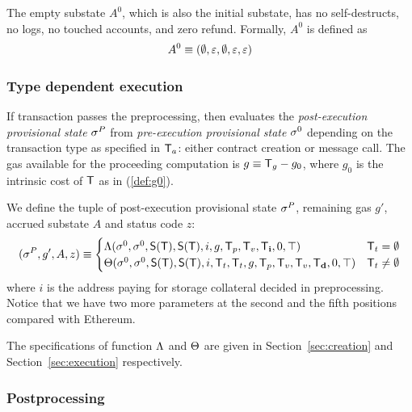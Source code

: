 The empty substate $A^0$, which is also the initial substate, has no self-destructs, no logs, no touched accounts, and zero refund. Formally, $A^0$ is defined as
\begin{align}
	A^0\equiv \left( \emptyset, \mathbb{\varepsilon}, \emptyset, \mathbb{\varepsilon},\mathbb{\varepsilon}\right)
\end{align}


\subsubsection{Type dependent execution}

If transaction passes the preprocessing, 
then {\name} evaluates the \emph{post-execution provisional state} $\mathbf{\sigma}^P$ from \emph{pre-execution provisional state} $\mathbf{\sigma}^0$ depending on the transaction type as specified in $\textsf{T}_a$: either contract creation or message call. 
%
The gas available for the proceeding computation is $g\equiv \textsf{T}_g-g_0$, where $g_0$ is the intrinsic cost of $\textsf{T}$ as in (\ref{def:g0}). 

We define the tuple of post-execution provisional state $\mathbf{\sigma}^{P}$, remaining gas $g'$, accrued substate $A$ and status code $z$:
\begin{align}\label{def:transform}
	(\mathbf{\sigma}^{P},g',A,z)\equiv
	\begin{cases}
		\mathrm{\Lambda}(\mathbf{\sigma}^0,\mathbf{\sigma}^0,\mathsf{S}{\left({\textsf{T}} \right)},\mathsf{S}{\left({\textsf{T}} \right)},i,g,\textsf{T}_p,\textsf{T}_v,\textsf{T}_{\bf i},0,\top) &  \textsf{T}_t=\emptyset \\
		\mathrm{\Theta}(\mathbf{\sigma}^0,\mathbf{\sigma}^0,\mathsf{S}{\left({\textsf{T}} \right)},\mathsf{S}{\left({\textsf{T}} \right)},i,\textsf{T}_t,\textsf{T}_t,g,\textsf{T}_p,\textsf{T}_v,\textsf{T}_v,\textsf{T}_{\bf d},0,\top) & \textsf{T}_t\neq\emptyset
	\end{cases}
\end{align}
%
where $i$ is the address paying for storage collateral decided in preprocessing. Notice that we have two more parameters at the second and the fifth positions compared with Ethereum. 

The specifications of function $\mathrm{\Lambda}$ and $\mathrm{\Theta}$ are given in Section~\ref{sec:creation} and Section~\ref{sec:execution} respectively.

\subsubsection{Postprocessing}


